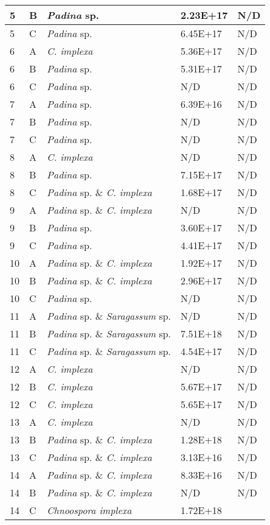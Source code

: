 \documentclass[12pt]{article}
\begin{document}
\begin{longtable}{ | p{1cm} | p{1cm} | p{3cm} | p{4cm} | p{4cm} | }
\hline
5&B&\emph{Padina} sp.&2.23E+17
&N/D\\
\hline
5&C&\emph{Padina} sp.&6.45E+17
&N/D\\
\hline
6&A&\emph{C. implexa}&5.36E+17
&N/D\\
\hline
6&B&\emph{Padina} sp.&5.31E+17
&N/D\\
\hline
6&C&\emph{Padina} sp.&N/D&N/D\\
\hline
7&A&\emph{Padina} sp.&6.39E+16
&N/D\\
\hline
7&B&\emph{Padina} sp.&N/D&N/D\\
\hline
7&C&\emph{Padina} sp.&N/D&N/D\\
\hline
8&A&\emph{C. implexa}&N/D&N/D\\
\hline
8&B&\emph{Padina} sp.&7.15E+17
&N/D\\
\hline
8&C&\emph{Padina} sp. \& \emph{C. implexa}&1.68E+17
&N/D\\
\hline
9&A&\emph{Padina} sp. \& \emph{C. implexa}&N/D&N/D\\
\hline
9&B&\emph{Padina} sp.&3.60E+17
&N/D\\
\hline
9&C&\emph{Padina} sp.&4.41E+17
&N/D\\
\hline
10&A&\emph{Padina} sp. \& \emph{C. implexa}&1.92E+17
&N/D\\
\hline
10&B&\emph{Padina} sp. \& \emph{C. implexa}&2.96E+17
&N/D\\
\hline
10&C&\emph{Padina} sp.&N/D&N/D\\
\hline
11&A&\emph{Padina} sp. \& \emph{Saragassum} sp.&N/D&N/D\\
\hline
11&B&\emph{Padina} sp. \& \emph{Saragassum} sp.&7.51E+18
&N/D\\
\hline
11&C&\emph{Padina} sp. \& \emph{Saragassum} sp.&4.54E+17
&N/D\\
\hline
12&A&\emph{C. implexa}&N/D&N/D\\
\hline
12&B&\emph{C. implexa}&5.67E+17
&N/D\\
\hline
12&C&\emph{C. implexa}&5.65E+17
&N/D\\
\hline
13&A&\emph{C. implexa}&N/D&N/D\\
\hline
13&B&\emph{Padina} sp. \& \emph{C. implexa}&1.28E+18
&N/D\\
\hline
13&C&\emph{Padina} sp. \& \emph{C. implexa}&3.13E+16
&N/D\\
\hline
14&A&\emph{Padina} sp. \& \emph{C. implexa}&8.33E+16
&N/D\\
\hline
14&B&\emph{Padina} sp. \& \emph{C. implexa}&N/D&N/D\\
\hline
14&C&\emph{Chnoospora implexa}&1.72E+18

\end{longtable}
\end{document}
